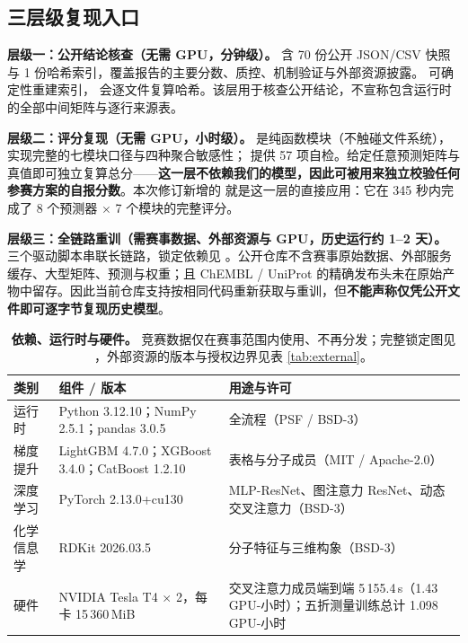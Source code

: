 \subsection{三层级复现入口}
\label{sec:threelevel}

\textbf{层级一：公开结论核查（无需 GPU，分钟级）。}  含 70 份公开 JSON/CSV 快照与 1 份哈希索引，覆盖报告的主要分数、质控、机制验证与外部资源披露。 可确定性重建索引， 会逐文件复算哈希。该层用于核查公开结论，不宣称包含运行时的全部中间矩阵与逐行来源表。

\textbf{层级二：评分复现（无需 GPU，小时级）。}  是纯函数模块（不触碰文件系统），实现完整的七模块口径与四种聚合敏感性； 提供 57 项自检。给定任意预测矩阵与真值即可独立复算总分——\textbf{这一层不依赖我们的模型，因此可被用来独立校验任何参赛方案的自报分数}。本次修订新增的  就是这一层的直接应用：它在 345 秒内完成了 8 个预测器 $\times$ 7 个模块的完整评分。

\textbf{层级三：全链路重训（需赛事数据、外部资源与 GPU，历史运行约 1--2 天）。} 三个驱动脚本串联长链路，锁定依赖见 。公开仓库不含赛事原始数据、外部服务缓存、大型矩阵、预测与权重；且 ChEMBL / UniProt 的精确发布头未在原始产物中留存。因此当前仓库支持按相同代码重新获取与重训，但\textbf{不能声称仅凭公开文件即可逐字节复现历史模型}。

\begin{table}[H]
\centering\small
\caption{\textbf{依赖、运行时与硬件。} 竞赛数据仅在赛事范围内使用、不再分发；完整锁定图见 ，外部资源的版本与授权边界见表 \ref{tab:external}。}
\label{tab:deps}
\begin{tabularx}{\textwidth}{@{}R{2.15cm}R{4.35cm}X@{}}
\toprule
\textbf{类别} & \textbf{组件 / 版本} & \textbf{用途与许可} \\
\midrule
运行时 & Python 3.12.10；NumPy 2.5.1；pandas 3.0.5 & 全流程（PSF / BSD-3） \\
梯度提升 & LightGBM 4.7.0；XGBoost 3.4.0；CatBoost 1.2.10 & 表格与分子成员（MIT / Apache-2.0） \\
深度学习 & PyTorch 2.13.0+cu130 & MLP-ResNet、图注意力 ResNet、动态交叉注意力（BSD-3） \\
化学信息学 & RDKit 2026.03.5 & 分子特征与三维构象（BSD-3）\citep{landrum_rdkit} \\
硬件 & NVIDIA Tesla T4 $\times$ 2，每卡 15\,360\,MiB & 交叉注意力成员端到端 5\,155.4\,s（1.43 GPU-小时）；五折测量训练总计 1.098 GPU-小时 \\
\bottomrule
\end{tabularx}
\end{table}

